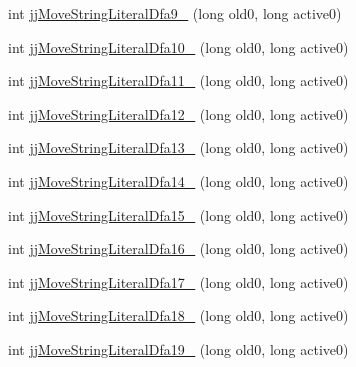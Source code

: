 \begin{DoxyCompactItemize}
\item 
int \hyperlink{classde_1_1uulm_1_1ecs_1_1ai_1_1owlapi_1_1krssparser_1_1_k_r_s_s2_parser_token_manager_a505befa4a4f94ccb793bc0203ee44bd8}{jj\-Move\-String\-Literal\-Dfa9\-\_} (long old0, long active0)
\item 
int \hyperlink{classde_1_1uulm_1_1ecs_1_1ai_1_1owlapi_1_1krssparser_1_1_k_r_s_s2_parser_token_manager_a19a9aa66ffade8e515cb821d77f4e79c}{jj\-Move\-String\-Literal\-Dfa10\-\_} (long old0, long active0)
\item 
int \hyperlink{classde_1_1uulm_1_1ecs_1_1ai_1_1owlapi_1_1krssparser_1_1_k_r_s_s2_parser_token_manager_acf55fc322b3e028b1cdda6dde4863b9d}{jj\-Move\-String\-Literal\-Dfa11\-\_} (long old0, long active0)
\item 
int \hyperlink{classde_1_1uulm_1_1ecs_1_1ai_1_1owlapi_1_1krssparser_1_1_k_r_s_s2_parser_token_manager_a0825c28e1c40e4e90ffda56c3ac19b71}{jj\-Move\-String\-Literal\-Dfa12\-\_} (long old0, long active0)
\item 
int \hyperlink{classde_1_1uulm_1_1ecs_1_1ai_1_1owlapi_1_1krssparser_1_1_k_r_s_s2_parser_token_manager_ae4e1d6f2b48e7e2553caa2b5adce7ac1}{jj\-Move\-String\-Literal\-Dfa13\-\_} (long old0, long active0)
\item 
int \hyperlink{classde_1_1uulm_1_1ecs_1_1ai_1_1owlapi_1_1krssparser_1_1_k_r_s_s2_parser_token_manager_afee31dbd62a8b01cdb18033864e8f20e}{jj\-Move\-String\-Literal\-Dfa14\-\_} (long old0, long active0)
\item 
int \hyperlink{classde_1_1uulm_1_1ecs_1_1ai_1_1owlapi_1_1krssparser_1_1_k_r_s_s2_parser_token_manager_a4f8adcbff1d58057a53fefa8d986b41a}{jj\-Move\-String\-Literal\-Dfa15\-\_} (long old0, long active0)
\item 
int \hyperlink{classde_1_1uulm_1_1ecs_1_1ai_1_1owlapi_1_1krssparser_1_1_k_r_s_s2_parser_token_manager_a8387ab7ef943918da7a9308a5ddca4af}{jj\-Move\-String\-Literal\-Dfa16\-\_} (long old0, long active0)
\item 
int \hyperlink{classde_1_1uulm_1_1ecs_1_1ai_1_1owlapi_1_1krssparser_1_1_k_r_s_s2_parser_token_manager_af7f923bc686bc8dd72b65fc7b98d9987}{jj\-Move\-String\-Literal\-Dfa17\-\_} (long old0, long active0)
\item 
int \hyperlink{classde_1_1uulm_1_1ecs_1_1ai_1_1owlapi_1_1krssparser_1_1_k_r_s_s2_parser_token_manager_a08d2404a05dbe945150b2760593cb7b9}{jj\-Move\-String\-Literal\-Dfa18\-\_} (long old0, long active0)
\item 
int \hyperlink{classde_1_1uulm_1_1ecs_1_1ai_1_1owlapi_1_1krssparser_1_1_k_r_s_s2_parser_token_manager_a0dbf8b8977988851928a23abfc0df583}{jj\-Move\-String\-Literal\-Dfa19\-\_} (long old0, long active0)

\end{DoxyCompactItemize}

